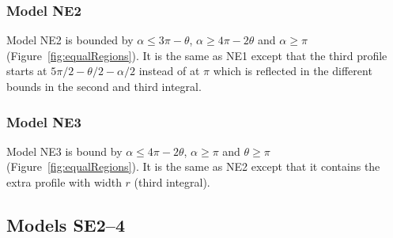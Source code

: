 





\subsubsection{Model NE2} \label{NE2}

Model NE2 is bounded by $\alpha \le 3\pi - \theta$, $\alpha \ge 4\pi - 2\theta$ and $\alpha \ge \pi$ (Figure~\ref{fig:equalRegions}).
It is the same as NE1 except that the third profile starts at $5\pi/2 - \theta/2 - \alpha/2$ instead of at $\pi$ which is reflected in the different bounds in the second and third integral.



\subsubsection{Model NE3} \label{NE3}

Model NE3 is bound by $\alpha \le 4\pi - 2\theta$, $\alpha \ge \pi$ and $\theta \ge \pi$ (Figure~\ref{fig:equalRegions}).
It is the same as NE2 except that it contains the extra profile with width $r$ (third integral).






\subsection{Models SE2--4} \label{SE}

